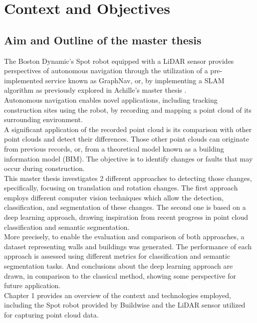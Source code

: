 \chapter{Context and Objectives}
\section{Aim and Outline of the master thesis}
The Boston Dynamic's Spot robot equipped with a LiDAR sensor provides perspectives of autonomous navigation through the utilization of a pre-implemented service known as GraphNav, or, by implementing a SLAM algorithm as previously explored in Achille's master thesis \cite{AchilleThesis}.\\
Autonomous navigation enables novel applications, including tracking construction sites using the robot, by recording and mapping a point cloud of its surrounding environment.\\

A significant application of the recorded point cloud is its comparison with other point clouds and detect their differences. Those other point clouds can originate from previous records, or, from a theoretical model known as a building information model (BIM). The objective is to identify changes or faults that may occur during construction.\\

This master thesis investigates 2 different approaches to detecting those changes, specifically, focusing on translation and rotation changes. The first approach employs different computer vision techniques which allow the detection, classification, and segmentation of these changes. The second one is based on a deep learning approach, drawing inspiration from recent progress in point cloud classification and semantic segmentation.\\

More precisely, to enable the evaluation and comparison of both approaches, a dataset representing walls and buildings was generated. The performance of each approach is assessed using different metrics for classification and semantic segmentation tasks. And conclusions about the deep learning approach are drawn, in comparison to the classical method, showing some perspective for future application.\\

Chapter 1 provides an overview of the context and technologies employed, including the Spot robot provided by Buildwise and the LiDAR sensor utilized for capturing point cloud data.\\ 

